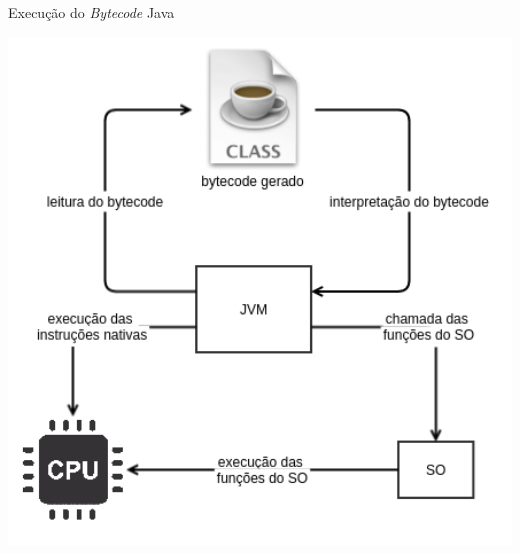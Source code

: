 \documentclass{beamer}
\begin{document}
\begin{frame}{Execução do \textit{Bytecode} Java}
    \begin{center}
        \includegraphics[keepaspectratio,width=1\textwidth,height=0.8\textheight]{jvm_scheme}
    \end{center}
\end{frame}
\end{document}
